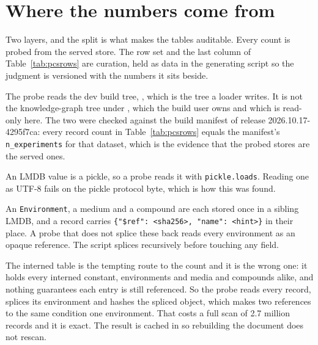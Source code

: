 
\section{Where the numbers come from}\label{sec:method}

Two layers, and the split is what makes the tables auditable. Every count is probed
from the served store. The row set and the last column of Table~\ref{tab:pcsrows} are
curation, held as data in the generating script so the judgment is versioned with the
numbers it sits beside.

 The probe reads the dev build tree,
, which is the tree a loader
writes. It is not the knowledge-graph tree under , which
the build user owns and which is read-only here. The two were checked against the build
manifest of release 2026.10.17-4295f7ca: every record count in
Table~\ref{tab:pcsrows} equals the manifest's \texttt{n\_experiments} for that dataset,
which is the evidence that the probed stores are the served ones.

 An LMDB value is a pickle, so a probe reads it
with \texttt{pickle.loads}. Reading one as UTF-8 fails on the pickle protocol byte,
which is how this was found.

 An \texttt{Environment}, a medium and a compound are
each stored once in a sibling  LMDB, and a record carries
\texttt{\{"\$ref": <sha256>, "name": <hint>\}} in their place. A probe that does not
splice these back reads every environment as an opaque reference. The script splices
recursively before touching any field.

 The interned table is the
tempting route to the count and it is the wrong one: it holds every interned constant,
environments and media and compounds alike, and nothing guarantees each entry is still
referenced. So the probe reads every record, splices its environment and hashes the
spliced object, which makes two references to the same condition one environment. That
costs a full scan of 2.7 million records and it is exact. The result is cached in
 so rebuilding the
document does not rescan.


